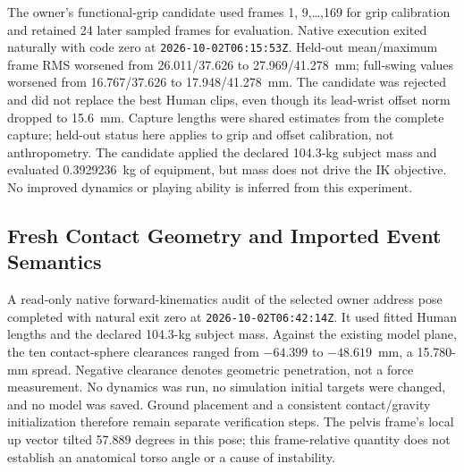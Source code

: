 \documentclass[11pt,a4paper]{article}
\begin{document}
The owner's functional-grip candidate used frames 1, 9,\ldots,169 for grip
calibration and retained 24 later sampled frames for evaluation. Native
execution exited naturally with code zero at \texttt{2026-10-02T06:15:53Z}.
Held-out mean/maximum frame RMS worsened from 26.011/37.626 to
27.969/41.278~mm; full-swing values worsened from 16.767/37.626 to
17.948/41.278~mm. The candidate was rejected and did not replace the best
Human clips, even though its lead-wrist offset norm dropped to 15.6~mm.
Capture lengths were shared estimates from the complete capture; held-out
status here applies to grip and offset calibration, not anthropometry.
The candidate applied the declared 104.3-kg subject mass and evaluated
0.3929236~kg of equipment, but mass does not drive the IK objective. No
improved dynamics or playing ability is inferred from this experiment.
\subsection{Fresh Contact Geometry and Imported Event Semantics}
A read-only native forward-kinematics audit of the selected owner address
pose completed with natural exit zero at \texttt{2026-10-02T06:42:14Z}.
It used fitted Human lengths and the declared 104.3-kg subject mass.
Against the existing model plane, the ten contact-sphere clearances ranged
from $-64.399$ to $-48.619$~mm, a 15.780-mm spread. Negative clearance
denotes geometric penetration, not a force measurement. No dynamics was
run, no simulation initial targets were changed, and no model was saved.
Ground placement and a consistent contact/gravity initialization therefore
remain separate verification steps. The pelvis frame's local up vector
tilted 57.889 degrees in this pose; this frame-relative quantity does not
establish an anatomical torso angle or a cause of instability.
\end{document}

